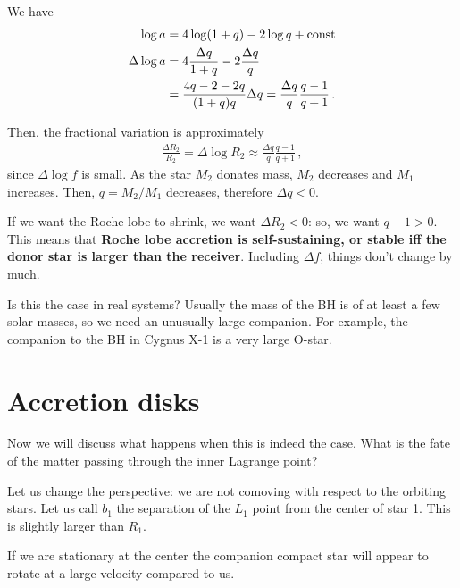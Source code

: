 \documentclass[main.tex]{subfiles}
\begin{document}
We have 
%
\begin{align}
\log a &= 4 \log (1 +q) - 2 \log q + \text{const} \\
\Delta \log a &= 4 \frac{\Delta q}{1 + q} - 2 \frac{\Delta q}{q }  \\
&= \frac{4q -2 -2 q}{(1 + q) q} \Delta q = \frac{\Delta q}{q} \frac{q -1}{q +1}
\,.
\end{align}

Then, the fractional variation is approximately 
%
\begin{align}
\frac{\Delta R_2}{R_2} = \Delta \log R_2 \approx 
\frac{\Delta q}{q} \frac{q -1}{q +1}
\,,
\end{align}
%
since \(\Delta \log f\) is small. As the star \(M_2 \) donates mass, \(M_2 \) decreases and \(M_1 \) increases. Then, \(q = M_2 / M_1 \) decreases, therefore \(\Delta q < 0\). 

If we want the Roche lobe to shrink, we want \(\Delta R_2 < 0\): so, we want \(q - 1 > 0\). 
This means that \textbf{Roche lobe accretion is self-sustaining, or stable iff the donor star is larger than the receiver}. 
Including \(\Delta f\), things don't change by much. 

Is this the case in real systems? Usually the mass of the BH is of at least a few solar masses, so we need an unusually large companion. 
For example, the companion to the BH in Cygnus X-1 is a very large O-star. 

\section{Accretion disks}

Now we will discuss what happens when this is indeed the case. What is the fate of the matter passing through the inner Lagrange point? 

Let us change the perspective: we are not comoving with respect to the orbiting stars. 
Let us call \(b_1 \) the separation of the \(L_1 \) point from the center of star 1. This is slightly larger than \(R_1 \). 

If we are stationary at the center the companion compact star will appear to rotate at a large velocity compared to us. 
\end{document}
